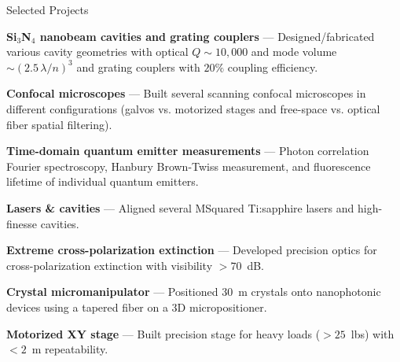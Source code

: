 \begin{rubric}{Selected Projects}

\entry* \textbf{Si$_3$N$_4$ nanobeam cavities and grating couplers} --- Designed/fabricated various cavity geometries with optical $Q\sim 10{,}000$ and mode volume $\sim(2.5\,\lambda/n)^3$ and grating couplers with $20\%$ coupling efficiency.\par

\entry* \textbf{Confocal microscopes} --- Built several scanning confocal microscopes in different configurations (galvos vs. motorized stages and free-space vs. optical fiber spatial filtering). \par
\entry* \textbf{Time-domain quantum emitter measurements} --- Photon correlation Fourier spectroscopy, Hanbury Brown-Twiss measurement, and fluorescence lifetime of individual quantum emitters.\par
\entry* \textbf{Lasers \& cavities} --- Aligned several MSquared Ti:sapphire lasers and high-finesse cavities.\par
\entry*\textbf{Extreme cross-polarization extinction} --- Developed precision optics for cross-polarization extinction with visibility $>70$~dB. 

\entry* \textbf{Crystal micromanipulator} --- Positioned 30~\textmu m crystals onto nanophotonic devices using a tapered fiber on a 3D micropositioner.\par
\entry* \textbf{Motorized XY stage} --- Built precision stage for heavy loads ($>25$~lbs) with $<2$~\textmu m repeatability.\par


\end{rubric}
